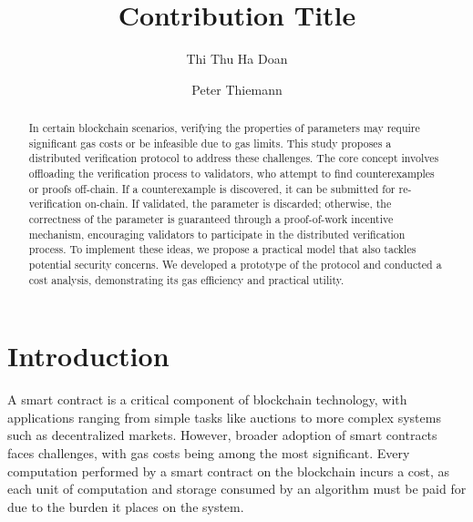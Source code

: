 \documentclass[runningheads]{llncs}
\begin{document}
%
\title{Contribution Title}
%
%
\author{Thi Thu Ha Doan\and Peter Thiemann}
%
%
%
\maketitle              %
%
\begin{abstract}
In certain blockchain scenarios, verifying the properties of parameters may require significant gas costs or be infeasible due to gas limits. This study proposes a distributed verification protocol to address these challenges. The core concept involves offloading the verification process to validators, who attempt to find counterexamples or proofs off-chain. If a counterexample is discovered, it can be submitted for re-verification on-chain. If validated, the parameter is discarded; otherwise, the correctness of the parameter is guaranteed through a proof-of-work incentive mechanism, encouraging validators to participate in the distributed verification process. To implement these ideas, we propose a practical model that also tackles potential security concerns. We developed a prototype of the protocol and conducted a cost analysis, demonstrating its gas efficiency and practical utility.
\end{abstract}
%
%
%
\section{Introduction}
\label{sec:introduction}
\lstset{language=solidity}
A smart contract is a critical component of blockchain technology, with applications ranging from simple tasks like auctions to more complex systems such as decentralized markets. However, broader adoption of smart contracts faces challenges, with gas costs being among the most significant. Every computation performed by a smart contract on the blockchain incurs a cost, as each unit of computation and storage consumed by an algorithm must be paid for due to the burden it places on the system.
\end{document}
